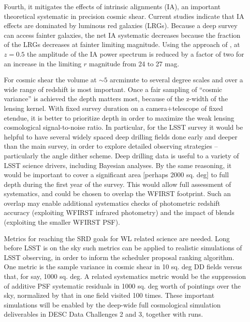 Fourth, it mitigates the effects of intrinsic alignments (IA), an important
theoretical systematic in precision cosmic shear.  Current studies
\citep{Heymans2013} indicate that IA effects are dominated by luminous red
galaxies (LRGs).  Because a deep survey can access fainter galaxies, the net IA
systematic decreases because the fraction of the LRGs decreases at fainter
limiting magnitude.  Using the approach of \citet{Joachimi2011}, at $z = 0.5$
the amplitude of the IA power spectrum is reduced by a factor of two for an
increase in the limiting $r$ magnitude from 24 to 27 mag.

For cosmic shear the volume at $\sim 5$ arcminute to several degree scales and
over a wide range of redshift is most important.  Once a fair sampling of
“cosmic variance” is achieved the depth matters most, because of the z-width of
the lensing kernel.  With fixed survey duration on a camera+telescope of fixed
etendue, it is better to prioritize depth in order to maximize the weak lensing
cosmological signal-to-noise ratio.  In particular, for the LSST survey it would
be helpful to have several widely spaced deep drilling fields done early and
deeper than the main survey, in order to explore detailed observing strategies --
particularly the angle dither scheme.  Deep drilling data is useful to a variety
of LSST science drivers, including Bayesian analyses.  By the same reasoning, it
would be important to cover a significant area [perhaps 2000 sq. deg] to full
depth during the first year of the survey.  This would allow full assessment of
systematics, and could be chosen to overlap the WFIRST footprint.  Such an
overlap may enable additional systematics checks of photometric redshift accuracy
(exploiting WFIRST infrared photometry) and the impact of blends (exploiting the
smaller WFIRST PSF).

Metrics for reaching the SRD goals for WL related science are needed. Long
before LSST is on the sky such metrics can be applied to realistic simulations
of LSST observing, in order to inform the scheduler proposal ranking algorithm.
One metric is the sample variance in cosmic shear in 10 sq. deg DD fields versus
that, for say, 1000 sq. deg.  A related systematics metric would be the
suppression of additive PSF systematic residuals in 1000 sq. deg worth of
pointings over the sky, normalized by that in one field visited 100 times. These
important simulations will be enabled by the deep-wide full cosmological
simulation deliverables in DESC Data Challenges 2 and 3, together with \OpSim
runs.


